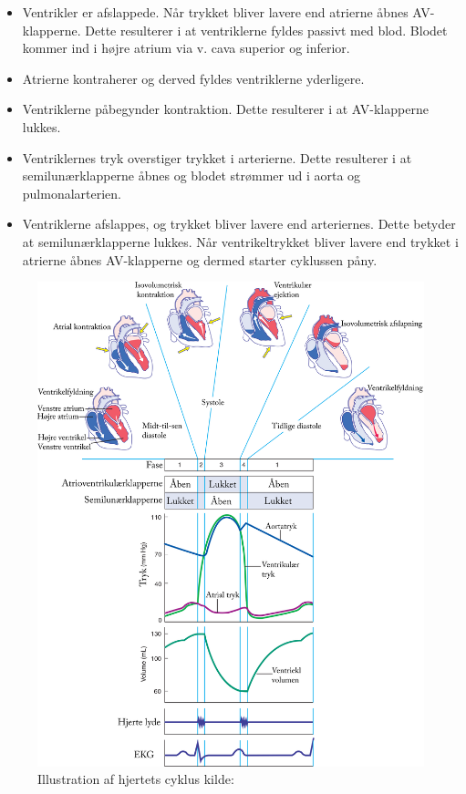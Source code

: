 \begin{itemize}
\item Ventrikler er afslappede. Når trykket bliver lavere end atrierne åbnes AV-klapperne. Dette resulterer i at ventriklerne fyldes passivt med blod. Blodet kommer ind i højre atrium via v. cava superior og inferior.
\item Atrierne kontraherer og derved fyldes ventriklerne yderligere.
\item Ventriklerne påbegynder kontraktion. Dette resulterer i at AV-klapperne lukkes.
\item Ventriklernes tryk overstiger trykket i arterierne. Dette resulterer i at semilunærklapperne åbnes og blodet strømmer ud i aorta og pulmonalarterien.
\item Ventriklerne afslappes, og trykket bliver lavere end arteriernes. Dette betyder at semilunærklapperne lukkes. Når ventrikeltrykket bliver lavere end trykket i atrierne åbnes AV-klapperne og dermed starter cyklussen påny.
\end{itemize}


\begin{figure}[H] %
\begin{center}
\includegraphics[width=1\linewidth]{figures/cyklus}
\end{center}
\caption{Illustration af hjertets cyklus kilde: \cite{cindy}}
\label{fig:hjerte_cyklus}
\end{figure}

